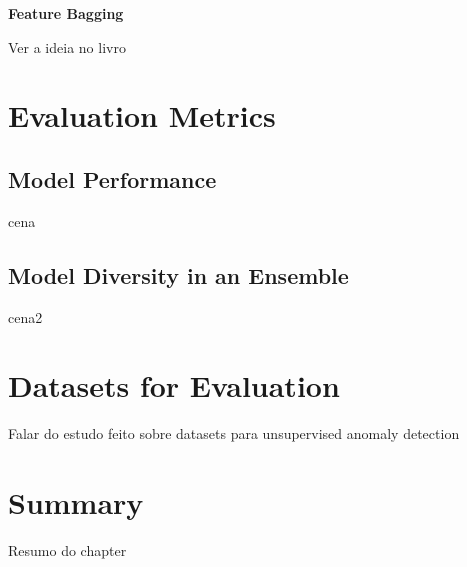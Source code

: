 \textbf{Feature Bagging}

Ver a ideia no livro

\section{Evaluation Metrics}

\subsection{Model Performance}
cena

\subsection{Model Diversity in an Ensemble}
cena2

\section{Datasets for Evaluation}

Falar do estudo feito sobre datasets para unsupervised anomaly detection

\section{Summary}

Resumo do chapter



